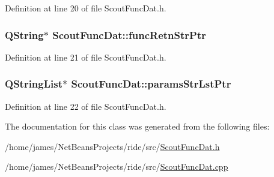 Definition at line 20 of file Scout\-Func\-Dat.\-h.

\hypertarget{class_scout_func_dat_a3c2f7ad50c5845171ee2a991fa3fa7ff}{
\subsubsection[{func\-Retn\-Str\-Ptr}]{\setlength{\rightskip}{0pt plus 5cm}Q\-String$\ast$ Scout\-Func\-Dat\-::func\-Retn\-Str\-Ptr\hspace{0.3cm}{\ttfamily [private]}}}\label{class_scout_func_dat_a3c2f7ad50c5845171ee2a991fa3fa7ff}


Definition at line 21 of file Scout\-Func\-Dat.\-h.

\hypertarget{class_scout_func_dat_a86bca60ebf50298f4c4e3e5d61ab98a5}{
\subsubsection[{params\-Str\-Lst\-Ptr}]{\setlength{\rightskip}{0pt plus 5cm}Q\-String\-List$\ast$ Scout\-Func\-Dat\-::params\-Str\-Lst\-Ptr\hspace{0.3cm}{\ttfamily [private]}}}\label{class_scout_func_dat_a86bca60ebf50298f4c4e3e5d61ab98a5}


Definition at line 22 of file Scout\-Func\-Dat.\-h.



The documentation for this class was generated from the following files\-:\begin{DoxyCompactItemize}
\item 
/home/james/\-Net\-Beans\-Projects/ride/src/\hyperlink{_scout_func_dat_8h}{Scout\-Func\-Dat.\-h}\item 
/home/james/\-Net\-Beans\-Projects/ride/src/\hyperlink{_scout_func_dat_8cpp}{Scout\-Func\-Dat.\-cpp}\end{DoxyCompactItemize}
